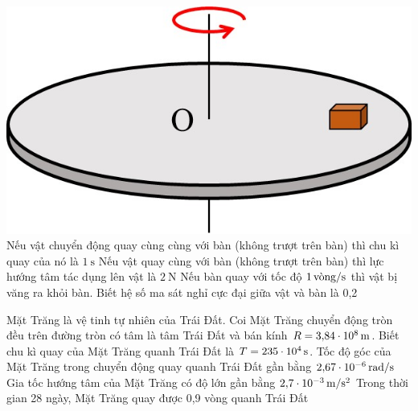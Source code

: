 \begin{ex}
{\includegraphics[scale=0.3]{../figs/VN10-2023-PH-TP032-P-5}}
	{Nếu vật chuyển động quay cùng cùng với bàn (không trượt trên bàn) thì chu kì quay của nó là $\SI{1}{\second}$}
	{Nếu vật quay cùng với bàn (không trượt trên bàn) thì lực hướng tâm tác dụng lên vật là $\SI{2}{\newton}$}
	{Nếu bàn quay với tốc độ $\SI{1}{\text{vòng/\second}}$ thì vật bị văng ra khỏi bàn. Biết hệ số ma sát nghỉ cực đại giữa vật và bàn là 0,2}
\end{ex}
\begin{ex}
	Mặt Trăng là vệ tinh tự nhiên của Trái Đất. Coi Mặt Trăng chuyển động tròn đều trên đường tròn có tâm là tâm Trái Đất và bán kính $R=\SI{3.84E8}{\meter}$. Biết chu kì quay của Mặt Trăng quanh Trái Đất là $T=\SI{235E4}{\second}$.
	{\True Tốc độ góc của Mặt Trăng trong chuyển động quay quanh Trái Đất gần bằng $\SI{2.67E-6}{\radian/\second}$}
	{\True Gia tốc hướng tâm của Mặt Trăng có độ lớn gần bằng $\SI{2.7E-3}{\meter/\second^2}$}
	{Trong thời gian 28 ngày, Mặt Trăng quay được 0,9 vòng quanh Trái Đất}
	\loigiai{}
\end{ex}
